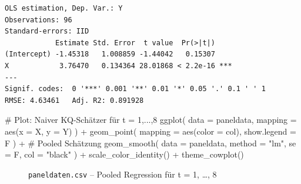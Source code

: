 \documentclass[
  a4paper,
  DIV=11,
  oneside]{scrreprt}
\newenvironment{Shaded}{\begin{snugshade}}{\end{snugshade}}
\newcommand{\AttributeTok}[1]{\textcolor[rgb]{0.40,0.45,0.13}{#1}}
\newcommand{\CommentTok}[1]{\textcolor[rgb]{0.37,0.37,0.37}{#1}}
\newcommand{\FunctionTok}[1]{\textcolor[rgb]{0.28,0.35,0.67}{#1}}
\newcommand{\NormalTok}[1]{\textcolor[rgb]{0.00,0.23,0.31}{#1}}
\newcommand{\SpecialCharTok}[1]{\textcolor[rgb]{0.37,0.37,0.37}{#1}}
\newcommand{\StringTok}[1]{\textcolor[rgb]{0.13,0.47,0.30}{#1}}
\begin{document}
\begin{verbatim}
OLS estimation, Dep. Var.: Y
Observations: 96
Standard-errors: IID 
            Estimate Std. Error  t value  Pr(>|t|)    
(Intercept) -1.45318   1.008859 -1.44042   0.15307    
X            3.76470   0.134364 28.01868 < 2.2e-16 ***
---
Signif. codes:  0 '***' 0.001 '**' 0.01 '*' 0.05 '.' 0.1 ' ' 1
RMSE: 4.63461   Adj. R2: 0.891928
\end{verbatim}

\begin{Shaded}
\begin{Highlighting}[]
\CommentTok{\# Plot: Naiver KQ{-}Schätzer für t = 1,...,8}
\FunctionTok{ggplot}\NormalTok{(}
  \AttributeTok{data =}\NormalTok{ paneldata,}
  \AttributeTok{mapping =} \FunctionTok{aes}\NormalTok{(}\AttributeTok{x =}\NormalTok{ X, }\AttributeTok{y =}\NormalTok{ Y)}
\NormalTok{) }\SpecialCharTok{+}
  \FunctionTok{geom\_point}\NormalTok{(}
    \AttributeTok{mapping =} \FunctionTok{aes}\NormalTok{(}\AttributeTok{color =}\NormalTok{ col),}
    \AttributeTok{show.legend =}\NormalTok{ F}
\NormalTok{  ) }\SpecialCharTok{+}
  \CommentTok{\# Pooled Schätzung}
  \FunctionTok{geom\_smooth}\NormalTok{(}
    \AttributeTok{data =}\NormalTok{ paneldata,}
    \AttributeTok{method =} \StringTok{"lm"}\NormalTok{, }
    \AttributeTok{se =}\NormalTok{ F,}
    \AttributeTok{col =} \StringTok{"black"}
\NormalTok{  ) }\SpecialCharTok{+}
  \FunctionTok{scale\_color\_identity}\NormalTok{() }\SpecialCharTok{+}
  \FunctionTok{theme\_cowplot}\NormalTok{()}
\end{Highlighting}
\end{Shaded}

\begin{figure}[t]


\caption{\label{fig-pooledregression2}\texttt{paneldaten.csv} -- Pooled
Regression für t = 1, \ldots, 8}

\end{figure}%
\end{document}
